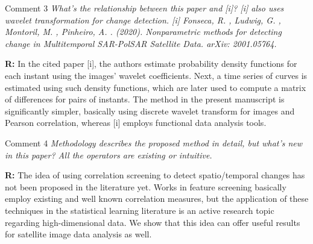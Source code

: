 \documentclass[11pt]{report}
\begin{document}
\medskip
\begin{mybox}{Comment 3}
\textit{What’s the relationship between this paper and [i]? [i] also uses wavelet transformation for change detection.
[i] Fonseca, R. , Ludwig, G. , Montoril, M. , Pinheiro, A. . (2020). Nonparametric methods for detecting change in Multitemporal SAR-PolSAR Satellite Data. arXiv: 2001.05764.}

\medskip

\textbf{R:} In the cited paper [i], the authors estimate probability density functions for each instant using the images' wavelet coefficients. Next, a time series of curves is estimated using such density functions, which are later used to compute a matrix of differences for pairs of instants. The method in the present manuscript is significantly simpler, basically using discrete wavelet transform for images and Pearson correlation, whereas [i] employs functional data analysis tools. 

\medskip


\end{mybox}

\vspace{0.3cm}


\medskip
\begin{mybox}{Comment 4}
\textit{Methodology describes the proposed method in detail, but what’s new in this paper? All the operators are existing or
intuitive.}

\medskip

\textbf{R:} The idea of using correlation screening to detect spatio/temporal changes has not been proposed in the literature yet. Works in feature screening basically employ existing and well known correlation measures, but the application of these techniques in the statistical learning literature is an active research topic regarding high-dimensional data. We show that this idea can offer useful results for satellite image data analysis as well.

\medskip


\end{mybox}

\vspace{0.3cm}
\end{document}
